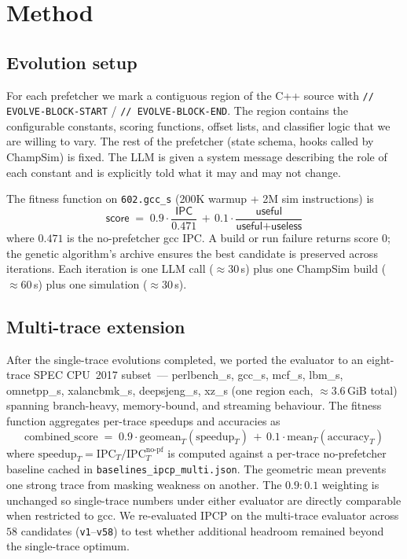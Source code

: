 \documentclass[11pt]{article}
\begin{document}
\section{Method}

\subsection{Evolution setup}

For each prefetcher we mark a contiguous region of the C++ source with
\texttt{// EVOLVE-BLOCK-START} / \texttt{// EVOLVE-BLOCK-END}. The
region contains the configurable constants, scoring functions, offset
lists, and classifier logic that we are willing to vary. The rest of the
prefetcher (state schema, hooks called by ChampSim) is fixed. The LLM
is given a system message describing the role of each constant and is
explicitly told what it may and may not change.

The fitness function on \texttt{602.gcc\_s} (200K warmup + 2M sim
instructions) is
\[
\textsf{score} \;=\; 0.9 \cdot \frac{\textsf{IPC}}{0.471} \,+\,
0.1 \cdot \frac{\textsf{useful}}{\textsf{useful}+\textsf{useless}}
\]
where $0.471$ is the no-prefetcher gcc IPC. A build or run failure
returns score $0$; the genetic algorithm's archive ensures the best
candidate is preserved across iterations. Each iteration is one LLM
call ($\approx 30$\,s) plus one ChampSim build ($\approx 60$\,s) plus
one simulation ($\approx 30$\,s).

\subsection{Multi-trace extension}

After the single-trace evolutions completed, we ported the evaluator to
an eight-trace SPEC CPU~2017 subset~--- perlbench\_s, gcc\_s, mcf\_s,
lbm\_s, omnetpp\_s, xalancbmk\_s, deepsjeng\_s, xz\_s (one region each,
${\approx}3.6$\,GiB total) spanning branch-heavy, memory-bound, and
streaming behaviour. The fitness function aggregates per-trace
speedups and accuracies as
\[
\mathrm{combined\_score}
\;=\; 0.9 \cdot \mathrm{geomean}_T(\mathrm{speedup}_T)
   \,+\, 0.1 \cdot \mathrm{mean}_T(\mathrm{accuracy}_T)
\]
where $\mathrm{speedup}_T = \mathrm{IPC}_T / \mathrm{IPC}^{\text{no-pf}}_T$
is computed against a per-trace no-prefetcher baseline cached in
\texttt{baselines\_ipcp\_multi.json}. The geometric mean prevents one
strong trace from masking weakness on another. The $0.9{:}0.1$ weighting
is unchanged so single-trace numbers under either evaluator are directly
comparable when restricted to gcc. We re-evaluated IPCP on the
multi-trace evaluator across $58$ candidates (\texttt{v1}--\texttt{v58})
to test whether additional headroom remained beyond the single-trace
optimum.
\end{document}
